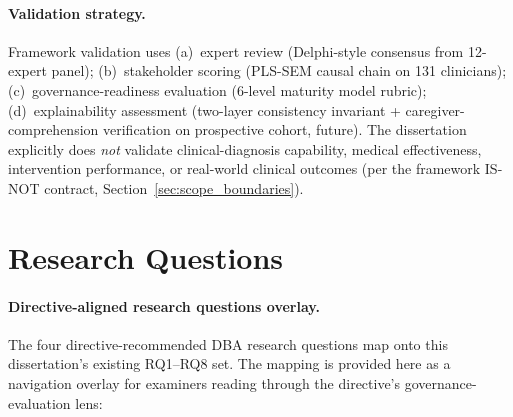 \paragraph{Validation strategy.} Framework validation uses (a)~expert review (Delphi-style consensus from 12-expert panel); (b)~stakeholder scoring (PLS-SEM causal chain on 131 clinicians); (c)~governance-readiness evaluation (6-level maturity model rubric); (d)~explainability assessment (two-layer consistency invariant + caregiver-comprehension verification on prospective cohort, future). The dissertation explicitly does \emph{not} validate clinical-diagnosis capability, medical effectiveness, intervention performance, or real-world clinical outcomes (per the framework IS-NOT contract, Section~\ref{sec:scope_boundaries}).


\section{Research Questions}
\label{sec:hypotheses}

\paragraph{Directive-aligned research questions overlay.}
\label{para:rqs_lens}
The four directive-recommended DBA research questions map onto this dissertation's existing RQ1--RQ8 set. The mapping is provided here as a navigation overlay for examiners reading through the directive's governance-evaluation lens:

